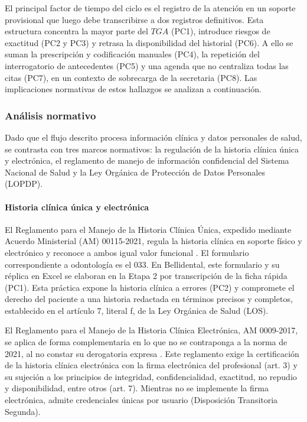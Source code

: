El principal factor de tiempo del ciclo es el registro de la atención en un soporte provisional que luego debe transcribirse a dos registros definitivos. Esta estructura concentra la mayor parte del $TGA$ (PC1), introduce riesgos de exactitud (PC2 y PC3) y retrasa la disponibilidad del historial (PC6). A ello se suman la prescripción y codificación manuales (PC4), la repetición del interrogatorio de antecedentes (PC5) y una agenda que no centraliza todas las citas (PC7), en un contexto de sobrecarga de la secretaria (PC8). Las implicaciones normativas de estos hallazgos se analizan a continuación.

\subsubsection{Análisis normativo}

Dado que el flujo descrito procesa información clínica y datos personales de salud, se contrasta con tres marcos normativos: la regulación de la historia clínica única y electrónica, el reglamento de manejo de información confidencial del Sistema Nacional de Salud y la Ley Orgánica de Protección de Datos Personales (LOPDP).

\paragraph{Historia clínica única y electrónica}

El Reglamento para el Manejo de la Historia Clínica Única, expedido mediante Acuerdo Ministerial (AM) 00115-2021, regula la historia clínica en soporte físico y electrónico y reconoce a ambos igual valor funcional \cite{msp2021hcu}. El formulario correspondiente a odontología es el 033. En Bellidental, este formulario y su réplica en Excel se elaboran en la Etapa 2 por transcripción de la ficha rápida (PC1). Esta práctica expone la historia clínica a errores (PC2) y compromete el derecho del paciente a una historia redactada en términos precisos y completos, establecido en el artículo 7, literal f, de la Ley Orgánica de Salud (LOS).

El Reglamento para el Manejo de la Historia Clínica Electrónica, AM 0009-2017, se aplica de forma complementaria en lo que no se contraponga a la norma de 2021, al no constar su derogatoria expresa \cite{msp2017hce}. Este reglamento exige la certificación de la historia clínica electrónica con la firma electrónica del profesional (art. 3) y su sujeción a los principios de integridad, confidencialidad, exactitud, no repudio y disponibilidad, entre otros (art. 7). Mientras no se implemente la firma electrónica, admite credenciales únicas por usuario (Disposición Transitoria Segunda).

